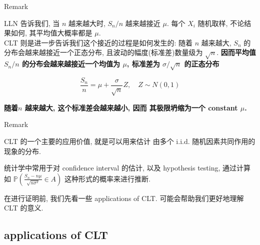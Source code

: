 \documentclass{qlnotes-export}
\begin{document}
\begin{qlremark}{Remark}

LLN 告诉我们, 当 \(n\) 越来越大时, \(S_{n}/n\) 越来越接近 \(\mu\). 每个 \(X_{i}\) 随机取样, 不论结果如何, 其平均值大概率都是 \(\mu\).\\
CLT 则是进一步告诉我们这个接近的过程是如何发生的: 随着 \(n\) 越来越大, \(S_{n}\) 的分布会越来越接近一个正态分布, 且波动的幅度(标准差)数量级为 \(\sqrt{n}\). \textbf{因而平均值 \(S_{n}/n\) 的分布会越来越接近一个均值为 \(\mu\), 标准差为 \(\sigma/\sqrt{n}\) 的正态分布}

\[\frac{S_{n}}{n} = \mu + \frac{\sigma}{\sqrt{n}}Z,\quad Z \sim N(0,1)\]

\textbf{随着\(n\) 越来越大, 这个标准差会越来越小, 因而 其极限坍缩为一个 constant \(\mu\).}\\

\end{qlremark}

\begin{qlremark}{Remark}

CLT 的一个主要的应用价值, 就是可以用来估计 由多个 i.i.d. 随机因素共同作用的现象的分布.

统计学中常用于对 confidence interval 的估计, 以及 hypothesis testing, 通过计算如 \({\mathbb{P}}\left( {\frac{S_{n} - n\mu}{\sqrt{n\sigma^{2}}} \in A} \right)\) 这种形式的概率来进行推断.\\

\end{qlremark}

在进行证明前, 我们先看一些 applications of CLT. 可能会帮助我们更好地理解 CLT 的意义.

\subsection{applications of CLT}\label{applications-of-clt}
\end{document}
